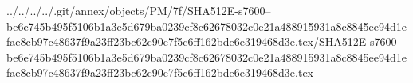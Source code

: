 ../../../../.git/annex/objects/PM/7f/SHA512E-s7600--be6e745b495f5106b1a3e5d679ba0239cf8c62678032c0e21a488915931a8c8845ee94d1efae8cb97c48637f9a23ff23bc62c90e7f5c6ff162bde6e319468d3e.tex/SHA512E-s7600--be6e745b495f5106b1a3e5d679ba0239cf8c62678032c0e21a488915931a8c8845ee94d1efae8cb97c48637f9a23ff23bc62c90e7f5c6ff162bde6e319468d3e.tex